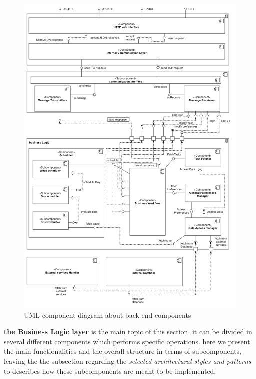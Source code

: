        
        \newpage
\begin{figure}[H]
    \centering
    \includegraphics[scale=0.2]{Pictures/ComponentDiagram/componentDiagram.png}
    \caption{UML component diagram about back-end components}
\end{figure}
\newpage

\textbf{the Business Logic layer} is the main topic of this section. it can be divided in several different components which performs specific operations. here we present the main functionalities and the overall structure in terms of subcomponents, leaving the the subsection regarding the \emph{selected architectural styles and patterns} to describes how these subcomponents are meant to be implemented.

